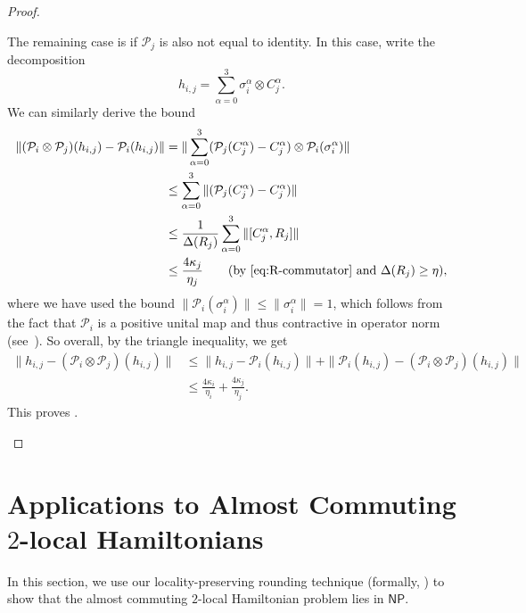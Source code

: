 \documentclass[a4paper,onecolumn,11pt]{quantumarticle}
\theoremstyle{plain}
\renewcommand{\cP}{\mathcal{P}}
\begin{document}
\begin{proof}
\begin{enumerate}
The remaining case is if $\cP_j$ is also not equal to identity. In this case, write the decomposition
\[ h_{i,j} = \sum_{\alpha=0}^{3} \sigma_i^\alpha \otimes C_j^\alpha. \]
We can similarly derive the bound
\begin{align}
    \| (\cP_i \otimes \cP_j)(h_{i,j}) - \cP_i(h_{i,j}) \| &= \| \sum_{\alpha =0}^3 (\cP_j(C_j^\alpha) - C_j^\alpha) \otimes \cP_i(\sigma_i^\alpha) \| \\
    &\leq  \sum_{\alpha =0}^3 \| (\cP_j(C_j^\alpha) - C_j^\alpha) \| \\
    &\leq \frac{1}{\Delta(R_j)} \sum_{\alpha =0}^3 \| [C_j^\alpha, R_j] \| \\
    &\leq \frac{4\kappa_j}{\eta_j} \qquad \text{(by \Cref{eq:R-commutator} and } \Delta(R_j) \geq \eta),
\end{align}
where we have used the bound $\| \cP_i(\sigma_i^\alpha) \| \leq \| \sigma_i^\alpha \| = 1$, which follows from the fact that $\cP_i$ is a positive unital map and thus contractive in operator norm (see~\cite[Theorem~6.12]{Watrous_2018}). 
So overall, by the triangle inequality, we get
\begin{align}
    \| h_{i,j} - (\cP_i \otimes \cP_j)(h_{i,j})  \| &\leq \| h_{i,j} - \cP_i(h_{i,j}) \| + \| \cP_i(h_{i,j}) - (\cP_i \otimes \cP_j)(h_{i,j}) \| \\
    &\leq \frac{4\kappa_i}{\eta_i} + \frac{4\kappa_j}{\eta_j}.
\end{align}
This proves .
\end{enumerate}
\end{proof}

\section{Applications to Almost Commuting $2$-local Hamiltonians}
In this section, we use our locality-preserving rounding technique (formally, ) to show that the almost commuting $2$-local Hamiltonian problem lies in $\mathsf{NP}$.
\end{document}
